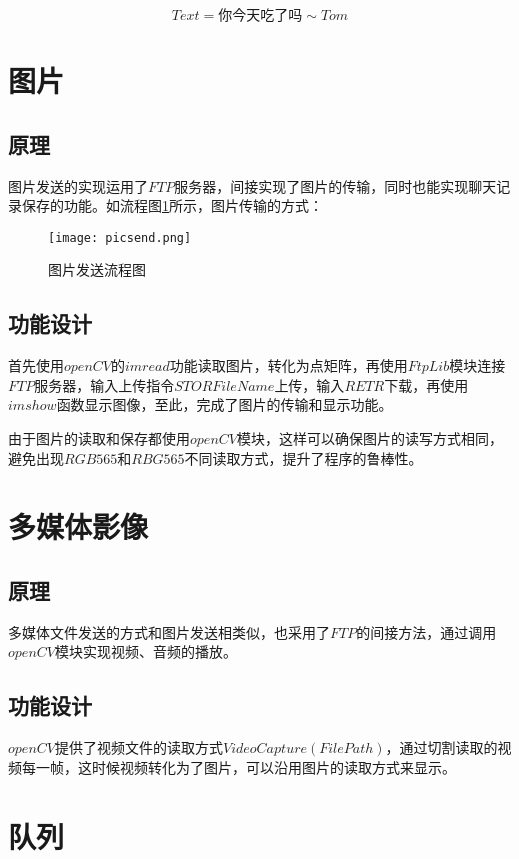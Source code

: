 \documentclass[forprint]{OSPaper}
\begin{document}
\begin{equation}
	\label{equ:4}
	Text = \mbox{你今天吃了吗} \sim Tom
\end{equation} 


\section{图片}
\subsection{原理}
图片发送的实现运用了$FTP$服务器，间接实现了图片的传输，同时也能实现聊天记录保存的功能。如流程图\ref{fig:11}所示，图片传输的方式：

\begin{figure}[ht!]
	\centering
	\texttt{[image: picsend.png]}
	\caption{图片发送流程图}
	\label{fig:11}
\end{figure}
\subsection{功能设计}

首先使用$openCV$的$imread$功能读取图片，转化为点矩阵，再使用$FtpLib$模块连接$FTP$服务器，输入上传指令$STOR FileName$上传，输入$RETR$下载，再使用$imshow$函数显示图像，至此，完成了图片的传输和显示功能。

由于图片的读取和保存都使用$openCV$模块，这样可以确保图片的读写方式相同，避免出现$RGB565$和$RBG565$不同读取方式，提升了程序的鲁棒性。

\section{多媒体影像}
\subsection{原理}
多媒体文件发送的方式和图片发送相类似，也采用了$FTP$的间接方法，通过调用$openCV$模块实现视频、音频的播放。
\subsection{功能设计}

$openCV$提供了视频文件的读取方式$VideoCapture(FilePath)$，通过切割读取的视频每一帧，这时候视频转化为了图片，可以沿用图片的读取方式来显示。

\section{队列}
\end{document}
